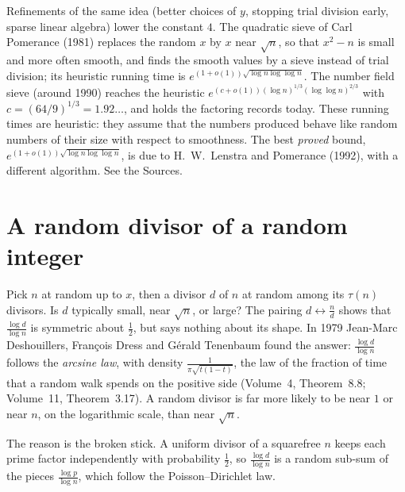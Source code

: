 \begin{remark}
Refinements of the same idea (better choices of $y$, stopping trial division early, sparse linear algebra) lower the constant $4$. The quadratic sieve of Carl Pomerance (1981) replaces the random $x$ by $x$ near $\sqrt n$, so that $x^2-n$ is small and more often smooth, and finds the smooth values by a sieve instead of trial division; its heuristic running time is $e^{(1+o(1))\sqrt{\log n\log\log n}}$. The number field sieve (around 1990) reaches the heuristic $e^{(c+o(1))(\log n)^{1/3}(\log\log n)^{2/3}}$ with $c=(64/9)^{1/3}=1.92\ldots$, and holds the factoring records today. These running times are heuristic: they assume that the numbers produced behave like random numbers of their size with respect to smoothness. The best \emph{proved} bound, $e^{(1+o(1))\sqrt{\log n\log\log n}}$, is due to H.~W.~Lenstra and Pomerance (1992), with a different algorithm. See the Sources.
\end{remark}

\section{A random divisor of a random integer}\label{sec:divisors}

Pick $n$ at random up to $x$, then a divisor $d$ of $n$ at random among its $\tau(n)$ divisors. Is $d$ typically small, near $\sqrt n$, or large? The pairing $d\leftrightarrow\frac nd$ shows that $\frac{\log d}{\log n}$ is symmetric about $\frac12$, but says nothing about its shape. In 1979 Jean-Marc Deshouillers, François Dress and Gérald Tenenbaum found the answer: $\frac{\log d}{\log n}$ follows the \emph{arcsine law}, with density $\frac1{\pi\sqrt{t(1-t)}}$, the law of the fraction of time that a random walk spends on the positive side (Volume~4, Theorem~8.8; Volume~11, Theorem~3.17). A random divisor is far more likely to be near $1$ or near $n$, on the logarithmic scale, than near $\sqrt n$.

The reason is the broken stick. A uniform divisor of a squarefree $n$ keeps each prime factor independently with probability $\frac12$, so $\frac{\log d}{\log n}$ is a random sub-sum of the pieces $\frac{\log p}{\log n}$, which follow the Poisson--Dirichlet law.

